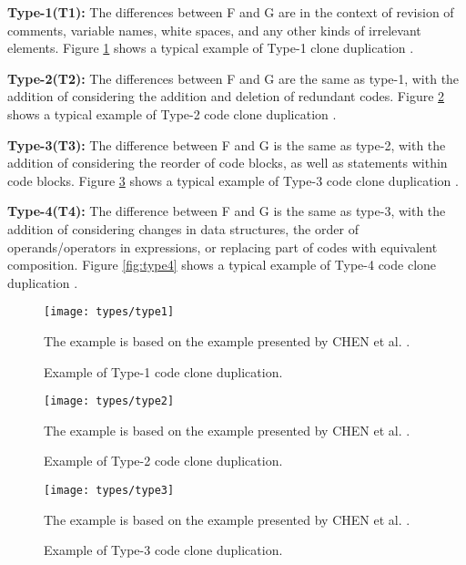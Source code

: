 \begin{itemize}
	\begin{item}
		\textbf{Type-1(T1):} The differences between F and G are in the context of revision of comments, variable names,
		white spaces, and any other kinds of irrelevant elements. Figure
		\ref{fig:type1} shows a typical example of Type-1 clone duplication 
		\citep{litreview}. 
	\end{item}
	\begin{item}
		\textbf{Type-2(T2):} The differences between F and G are the same as type-1, with the addition of 
		considering the addition and deletion of redundant codes. Figure
		\ref{fig:type2} shows a typical example of Type-2 code clone duplication  \citep{litreview}. 
	\end{item}
	\begin{item}
		\textbf{Type-3(T3):} The difference between F and G is the same as type-2, with the addition of considering 
		the reorder of code blocks, as well as statements within code blocks. Figure
		\ref{fig:type3} shows a typical example of 
		Type-3 code clone duplication \citep{litreview}. 
	\end{item}
	\begin{item}
		\textbf{Type-4(T4):} The difference between F and G is the same as type-3, with the addition of considering 
		changes in data structures, the order of operands/operators in expressions, or replacing part of codes 
		with equivalent composition. Figure
		\ref{fig:type4} shows a typical example of Type-4 code clone duplication \citep{litreview}. 
	\end{item}

\end{itemize}

\begin{figure}
\texttt{[image: types/type1]}
\caption{Example of Type-1 code clone duplication.}
The example is based on the example presented by CHEN et al. \citep{litreview}. 
\label{fig:type1}
\end{figure}

\begin{figure}
\texttt{[image: types/type2]}
\caption{Example of Type-2 code clone duplication.}
The example is based on the example presented by CHEN et al. \citep{litreview}. 
\label{fig:type2}
\end{figure}

\begin{figure}
\texttt{[image: types/type3]}
\caption{Example of Type-3 code clone duplication.}
The example is based on the example presented by CHEN et al. \citep{litreview}. 
\label{fig:type3}
\end{figure}

